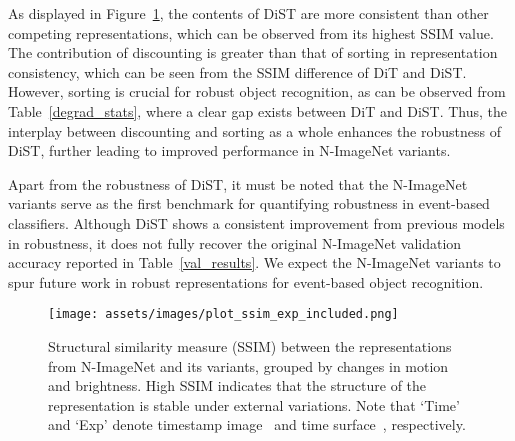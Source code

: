 As displayed in Figure~\ref{fig:ssim}, the contents of DiST are more consistent than other competing representations, which can be observed from its highest SSIM value.
The contribution of discounting is greater than that of sorting in representation consistency, which can be seen from the SSIM difference of DiT and DiST.
However, sorting is crucial for robust object recognition, as can be observed from Table~\ref{degrad_stats}, where a clear gap exists between DiT and DiST.
Thus, the interplay between discounting and sorting as a whole enhances the robustness of DiST, further leading to improved performance in N-ImageNet variants.

Apart from the robustness of DiST, it must be noted that the N-ImageNet variants serve as the first benchmark for quantifying robustness in event-based classifiers.
Although DiST shows a consistent improvement from previous models in robustness, it does not fully recover the original N-ImageNet validation accuracy reported in Table~\ref{val_results}.
We expect the N-ImageNet variants to spur future work in robust representations for event-based object recognition.

\begin{figure}
\centering
\texttt{[image: assets/images/plot\_ssim\_exp\_included.png]}
\caption{Structural similarity measure (SSIM) between the representations from N-ImageNet and its variants, grouped by changes in motion and brightness. 
High SSIM indicates that the structure of the representation is stable under external variations.
Note that `Time' and `Exp' denote timestamp image~\cite{timestamp_image} and time surface~\cite{hots}, respectively.
}
\label{fig:ssim}
\end{figure}
